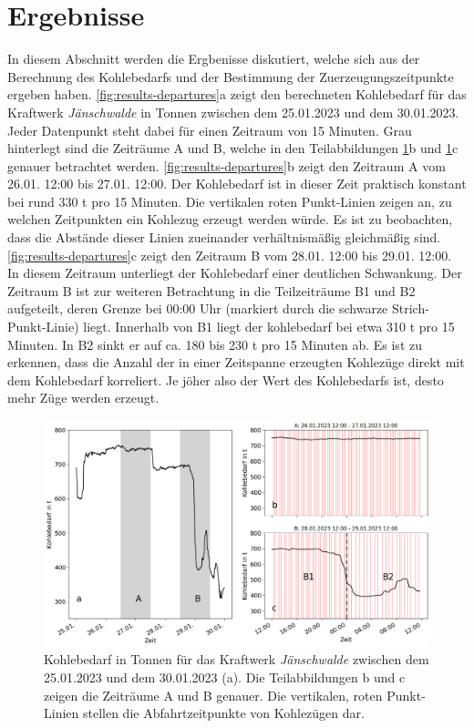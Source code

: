 \section{Ergebnisse}

In diesem Abschnitt werden die Ergbenisse diskutiert, welche sich aus der Berechnung des Kohlebedarfs und der Bestimmung der Zuerzeugungszeitpunkte ergeben haben. \autoref{fig:results-departures}a zeigt den berechneten Kohlebedarf für das Kraftwerk \emph{Jänschwalde} in Tonnen zwischen dem 25.01.2023 und dem 30.01.2023. Jeder Datenpunkt steht dabei für einen Zeitraum von 15 Minuten. Grau hinterlegt sind die Zeiträume A und B, welche in den Teilabbildungen \ref{fig:results-departures}b und \ref{fig:results-departures}c genauer betrachtet werden. \autoref{fig:results-departures}b zeigt den Zeitraum A vom 26.01. 12:00 bis 27.01. 12:00. Der Kohlebedarf ist in dieser Zeit praktisch konstant bei rund 330 t pro 15 Minuten. Die vertikalen roten Punkt-Linien zeigen an, zu welchen Zeitpunkten ein Kohlezug erzeugt werden würde. Es ist zu beobachten, dass die Abstände dieser Linien zueinander verhältnismäßig gleichmäßig sind. \autoref{fig:results-departures}c zeigt den Zeitraum B vom 28.01. 12:00 bis 29.01. 12:00. In diesem Zeitraum unterliegt der Kohlebedarf einer deutlichen Schwankung. Der Zeitraum B ist zur weiteren Betrachtung in die Teilzeiträume B1 und B2 aufgeteilt, deren Grenze bei 00:00 Uhr (markiert durch die schwarze Strich-Punkt-Linie) liegt. Innerhalb von B1 liegt der kohlebedarf bei etwa 310 t pro 15 Minuten. In B2 sinkt er auf ca. 180 bis 230 t pro 15 Minuten ab. Es ist zu erkennen, dass die Anzahl der in einer Zeitspanne erzeugten Kohlezüge direkt mit dem Kohlebedarf korreliert. Je jöher also der Wert des Kohlebedarfs ist, desto mehr Züge werden erzeugt.

\begin{figure}[!ht]
	\centering
	\includegraphics[width=1.0\linewidth]{images/results/departures.png}
	\caption{Kohlebedarf in Tonnen für das Kraftwerk \emph{Jänschwalde} zwischen dem 25.01.2023 und dem 30.01.2023 (a). Die Teilabbildungen b und c zeigen die Zeiträume A und B genauer. Die vertikalen, roten Punkt-Linien stellen die Abfahrtzeitpunkte von Kohlezügen dar.}
	\label{fig:results-departures}
\end{figure}

